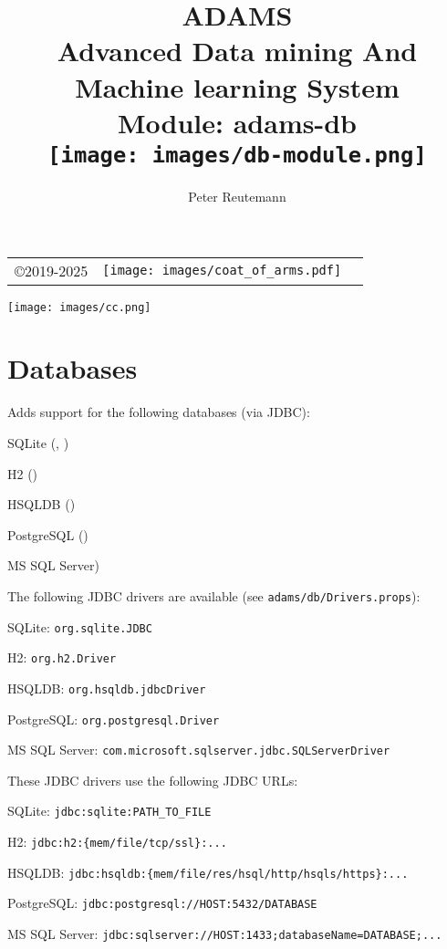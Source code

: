 \documentclass[a4paper]{book}
\title{
  \textbf{ADAMS} \\
  {\Large \textbf{A}dvanced \textbf{D}ata mining \textbf{A}nd \textbf{M}achine
  learning \textbf{S}ystem} \\
  {\Large Module: adams-db} \\
  \vspace{1cm}
  \texttt{[image: images/db-module.png]} \\
}
\author{
  Peter Reutemann
}
\begin{document}
\begin{titlepage}
\maketitle

\thispagestyle{empty}
\center
\begin{table}[b]
	\begin{tabular}{c l l}
		\parbox[c][2cm]{2cm}{\copyright 2019-2025} &
		\parbox[c][2cm]{5cm}{\texttt{[image: images/coat\_of\_arms.pdf]}} \\
	\end{tabular}
	\texttt{[image: images/cc.png]} \\
\end{table}

\end{titlepage}

\tableofcontents

\chapter{Databases}
Adds support for the following databases (via JDBC):
\begin{tight_itemize}
  \item SQLite (\cite{sqlite}, \cite{sqlitexerial})
  \item H2 (\cite{h2})
  \item HSQLDB (\cite{hsqldb})
  \item PostgreSQL (\cite{postgresql})
  \item MS SQL Server\cite{mssql})
\end{tight_itemize}
The following JDBC drivers are available (see \texttt{adams/db/Drivers.props}):
\begin{tight_itemize}
  \item SQLite: \verb|org.sqlite.JDBC|
  \item H2: \verb|org.h2.Driver|
  \item HSQLDB: \verb|org.hsqldb.jdbcDriver|
  \item PostgreSQL: \verb|org.postgresql.Driver|
  \item MS SQL Server: \verb|com.microsoft.sqlserver.jdbc.SQLServerDriver|
\end{tight_itemize}
These JDBC drivers use the following JDBC URLs:
\begin{tight_itemize}
  \item SQLite: \verb|jdbc:sqlite:PATH_TO_FILE|
  \item H2: \verb|jdbc:h2:{mem/file/tcp/ssl}:...|
  \item HSQLDB: \verb|jdbc:hsqldb:{mem/file/res/hsql/http/hsqls/https}:...|
  \item PostgreSQL: \verb|jdbc:postgresql://HOST:5432/DATABASE|
  \item MS SQL Server: \verb|jdbc:sqlserver://HOST:1433;databaseName=DATABASE;...|
\end{tight_itemize}
\end{document}
